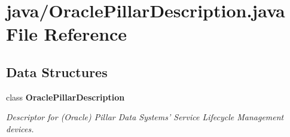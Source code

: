 \section{java/\-Oracle\-Pillar\-Description.java File Reference}
\label{OraclePillarDescription_8java}
\subsection*{Data Structures}
\begin{DoxyCompactItemize}
\item 
class {\bf Oracle\-Pillar\-Description}
\begin{DoxyCompactList}\small\item\em Descriptor for (Oracle) Pillar Data Systems' Service Lifecycle Management devices. \end{DoxyCompactList}\end{DoxyCompactItemize}
